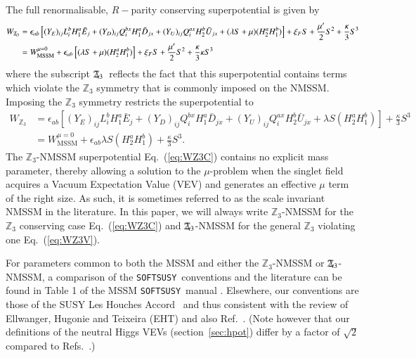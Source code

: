 \documentclass[final,3p,times,pdflatex]{elsarticle}
\def\SOFTSUSY{{\tt SOFTSUSY}}
\newcommand{\Zv}{\,\mathbf{\backslash}\mkern-11.0mu{\mathbb{Z}}_{3}} %
\begin{document}
The full renormalisable, $R-$parity conserving superpotential is given by
%
\begin{align} 
 W_{\Zv}  &=  \epsilon_{ab} \left[ (Y_E)_{ij} L_i^b H_1^a \bar{E}_{j} 
+ (Y_D)_{ij} Q_i^{bx} H_1^a \bar{D}_{jx} 
+ (Y_U)_{ij} Q_i^{ax} H_2^b \bar{U}_{jx} 
+ (\lambda S + \mu)(H^a_2 H^b_1) \right]  + \xi_FS 
+ \frac{\mu^\prime}{2} S^{2} + \frac{\kappa}{3}S^{3} \\
%
&= W_\mathrm{MSSM}^{\mu =0} 
+ \epsilon_{ab}\left[ (\lambda S + \mu)(H^a_2 H^b_1) \right]  
+ \xi_FS + \frac{\mu^\prime}{2}S^{2} + \frac{\kappa}{3}\kappa S^{3} \,
\label{eq:WZ3V}
\end{align}
%
\noindent where the subscript $\Zv$~reflects the fact that this superpotential 
contains terms which violate the $\mathbb{Z}_3$ symmetry that is commonly 
imposed on the NMSSM.  Imposing the $\mathbb{Z}_3$ symmetry restricts the 
superpotential to
%
\begin{align} 
 W_{\mathbb{Z}_3} &= \epsilon_{ab} \left[(Y_E)_{ij} L_i^b H_1^a \bar{E}_{j} 
+ (Y_D)_{ij} Q_i^{bx} H_1^a \bar{D}_{jx} + (Y_U)_{ij} Q_i^{ax} H_2^b \bar{U}_{jx}  
+ \lambda S(H^a_2 H^b_1) \right] + \frac{\kappa}{3}S^{3} \\
%
&= W_\mathrm{MSSM}^{\mu =0}  + \epsilon_{ab} \lambda S (H^a_2 H^b_1) 
+ \frac{\kappa}{3}S^{3}.
\label{eq:WZ3C}
\end{align}
%
\noindent The $\mathbb{Z}_3$-NMSSM superpotential Eq.~(\ref{eq:WZ3C}) contains no 
explicit mass parameter, thereby allowing a solution to the $\mu$-problem when 
the singlet field acquires a Vacuum Expectation Value (VEV) and generates an 
effective $\mu$ term of the right size. As such, it is sometimes referred to as 
the scale invariant NMSSM in the literature.  In this paper, we will always 
write $\mathbb{Z}_3$-NMSSM for the $\mathbb{Z}_3$ conserving case 
Eq.~(\ref{eq:WZ3C}) and $\Zv$-NMSSM for the general $\mathbb{Z}_3$ violating one 
Eq.~(\ref{eq:WZ3V}). 

For parameters common to both the MSSM and either the $\mathbb{Z}_3$-NMSSM or 
$\Zv$-NMSSM, a comparison of the \SOFTSUSY~conventions and the literature can be 
found in Table 1 of the MSSM \SOFTSUSY~manual \cite{Allanach:2001kg}.  Elsewhere, 
our conventions are those of the SUSY Les Houches Accord~\cite{Allanach:2008qq} 
and thus consistent with the review of Ellwanger, Hugonie and Teixeira (EHT) 
 \cite{Ellwanger:2009dp} and also Ref.~\cite{Degrassi:2009yq}. (Note however that 
our definitions of the neutral Higgs VEVs (section~\ref{sec:hpot}) differ by a 
factor of $\sqrt{2}$ compared to Refs.~\cite{Ellwanger:2009dp,Degrassi:2009yq}.)
\end{document}
